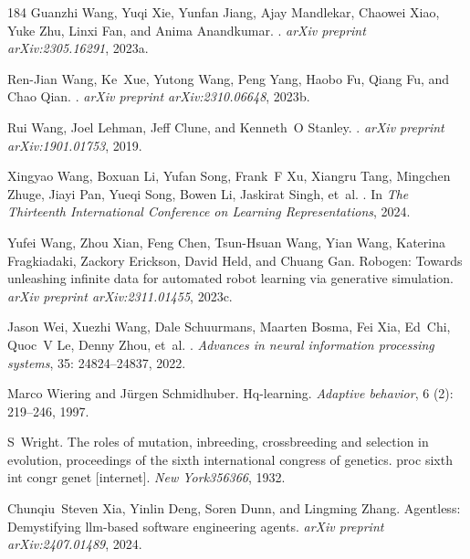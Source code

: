 \begin{thebibliography}{184}
Guanzhi Wang, Yuqi Xie, Yunfan Jiang, Ajay Mandlekar, Chaowei Xiao, Yuke Zhu,
  Linxi Fan, and Anima Anandkumar.
.
\newblock \emph{arXiv preprint arXiv:2305.16291}, 2023{a}.

Ren-Jian Wang, Ke~Xue, Yutong Wang, Peng Yang, Haobo Fu, Qiang Fu, and Chao
  Qian.
.
\newblock \emph{arXiv preprint arXiv:2310.06648}, 2023{b}.

Rui Wang, Joel Lehman, Jeff Clune, and Kenneth~O Stanley.
.
\newblock \emph{arXiv preprint arXiv:1901.01753}, 2019.

Xingyao Wang, Boxuan Li, Yufan Song, Frank~F Xu, Xiangru Tang, Mingchen Zhuge,
  Jiayi Pan, Yueqi Song, Bowen Li, Jaskirat Singh, et~al.
.
\newblock In \emph{The Thirteenth International Conference on Learning
  Representations}, 2024.

Yufei Wang, Zhou Xian, Feng Chen, Tsun-Hsuan Wang, Yian Wang, Katerina
  Fragkiadaki, Zackory Erickson, David Held, and Chuang Gan.
\newblock Robogen: Towards unleashing infinite data for automated robot
  learning via generative simulation.
\newblock \emph{arXiv preprint arXiv:2311.01455}, 2023{c}.

Jason Wei, Xuezhi Wang, Dale Schuurmans, Maarten Bosma, Fei Xia, Ed~Chi, Quoc~V
  Le, Denny Zhou, et~al.
.
\newblock \emph{Advances in neural information processing systems},
  35: 24824--24837, 2022.

Marco Wiering and J{\"u}rgen Schmidhuber.
\newblock Hq-learning.
\newblock \emph{Adaptive behavior}, 6 (2): 219--246, 1997.

S~Wright.
\newblock The roles of mutation, inbreeding, crossbreeding and selection in
  evolution, proceedings of the sixth international congress of genetics. proc
  sixth int congr genet [internet].
\newblock \emph{New York356366}, 1932.

Chunqiu~Steven Xia, Yinlin Deng, Soren Dunn, and Lingming Zhang.
\newblock Agentless: Demystifying llm-based software engineering agents.
\newblock \emph{arXiv preprint arXiv:2407.01489}, 2024.


\end{thebibliography}
